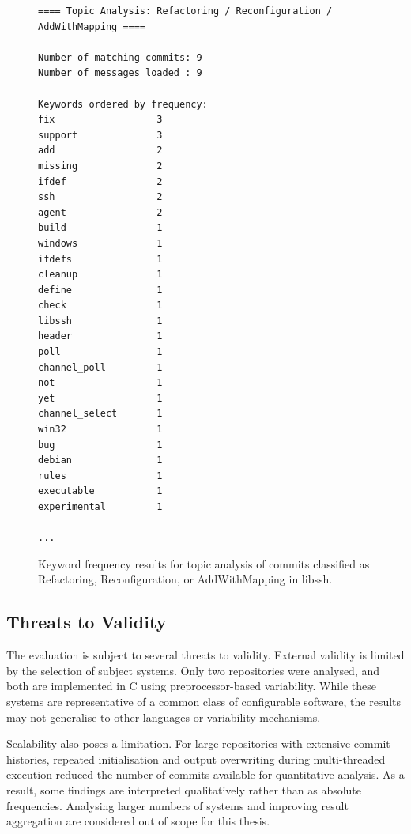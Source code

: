 \begin{figure}[t]
\centering
\begin{lstlisting}[basicstyle=\ttfamily\small, frame=single]
==== Topic Analysis: Refactoring / Reconfiguration / AddWithMapping ====

Number of matching commits: 9
Number of messages loaded : 9

Keywords ordered by frequency:
fix                  3
support              3
add                  2
missing              2
ifdef                2
ssh                  2
agent                2
build                1
windows              1
ifdefs               1
cleanup              1
define               1
check                1
libssh               1
header               1
poll                 1
channel_poll         1
not                  1
yet                  1
channel_select       1
win32                1
bug                  1
debian               1
rules                1
executable           1
experimental         1

...

\end{lstlisting}
\caption{Keyword frequency results for topic analysis of commits classified as
Refactoring, Reconfiguration, or AddWithMapping in libssh.}
\label{fig:topic-analysis-keywords}
\end{figure}




\subsection{Threats to Validity}
\cite{Wohlin2024_experimentationInSE}

The evaluation is subject to several threats to validity. External validity is limited by the selection of subject systems. Only two repositories were analysed, and both are implemented in C using preprocessor-based variability. While these systems are representative of a common class of configurable software, the results may not generalise to other languages or variability mechanisms.

Scalability also poses a limitation. For large repositories with extensive commit histories, repeated initialisation and output overwriting during multi-threaded execution reduced the number of commits available for quantitative analysis. As a result, some findings are interpreted qualitatively rather than as absolute frequencies. Analysing larger numbers of systems and improving result aggregation are considered out of scope for this thesis.

